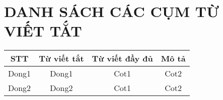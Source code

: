 \chapter*{\centering DANH SÁCH CÁC CỤM TỪ VIẾT TẮT}



\begin{table}[h]

\centering

\begin{tabular}{|c|c|c|c|}

\hline

STT & Từ viết tắt & Từ viết đầy đủ & Mô tả \\

\hline

Dong1 & Dong1 & Cot1 & Cot2 \\

\hline

Dong2 & Dong2 & Cot1 & Cot2 \\

\hline

\end{tabular}

\end{table}










